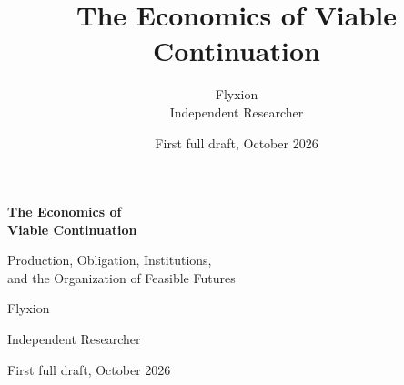 \documentclass[11pt,twoside,openany]{book}
\title{The Economics of Viable Continuation}
\author{Flyxion\\Independent Researcher}
\date{First full draft, October 2026}
\begin{document}
\frontmatter
\begin{titlepage}
\centering
\vspace*{1.2in}
{\Huge\bfseries The Economics of\\[0.3em] Viable Continuation\par}
\vspace{0.5in}
{\Large Production, Obligation, Institutions,\\and the Organization of Feasible Futures\par}
\vspace{1.0in}
{\Large Flyxion\par}
{\large Independent Researcher\par}
\vfill
{\large First full draft, October 2026\par}
\end{titlepage}

\tableofcontents







\mainmatter













\appendix




\backmatter
\nocite{*}


\end{document}
